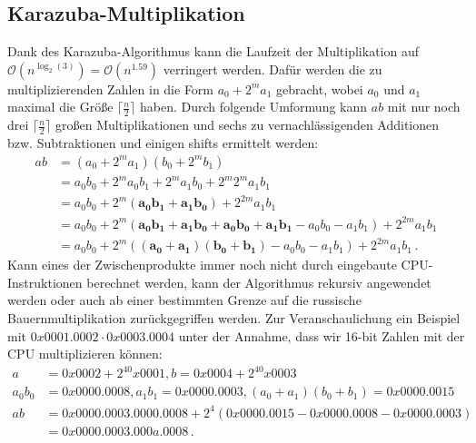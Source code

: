 \documentclass[course=erap]{aspdoc}
\begin{document}
\subsection{Karazuba-Multiplikation}
Dank des Karazuba-Algorithmus kann die Laufzeit der Multiplikation auf $\mathcal{O}(n^{\log_2(3)}) = \mathcal{O}(n^{1.59})$\cite{the_art_of_programming} verringert werden.
Dafür werden die zu multiplizierenden Zahlen in die Form $a_0+2^ma_1$ gebracht, wobei $a_0$ und $a_1$ maximal die Größe $\lceil\frac{n}{2}\rceil$ haben.
Durch folgende Umformung kann $ab$ mit nur noch drei $\lceil\frac{n}{2}\rceil$ großen Multiplikationen und sechs zu vernachlässigenden Additionen bzw. Subtraktionen und einigen shifts ermittelt werden:
\begin{align*}
a b &= (a_0+2^ma_1) (b_0+2^mb_1)\\
      &= a_0b_0 + 2^ma_0b_1 + 2^ma_1b_0 + 2^m2^ma_1b_1\\
      &= a_0b_0 + 2^m(\mathbf{a_0b_1 + a_1b_0}) + 2^{2m}a_1b_1\\
      &= a_0b_0 + 2^m(\mathbf{a_0b_1 + a_1b_0 + a_0b_0 + a_1b_1} - a_0b_0 - a_1b_1) + 2^{2m}a_1b_1\\
      &= a_0b_0 + 2^m(\mathbf{(a_0+a_1)(b_0+b_1)} - a_0b_0 - a_1b_1) + 2^{2m}a_1b_1 \, .
\end{align*}
Kann eines der Zwischenprodukte immer noch nicht durch eingebaute CPU-Instruktionen berechnet werden, kann der Algorithmus rekursiv angewendet werden oder auch ab einer bestimmten Grenze auf die russische Bauernmultiplikation zurückgegriffen werden.
Zur Veranschaulichung ein Beispiel mit $0x0001.0002 \cdot 0x0003.0004$ unter der Annahme, dass wir 16-bit Zahlen mit der CPU multiplizieren können:
\begin{align*}
      a &= 0x0002 + 2^40x0001, b = 0x0004 + 2^40x0003 \\
      a_0b_0 &= 0x0000.0008, a_1b_1 = 0x0000.0003, (a_0+a_1)(b_0+b_1) = 0x0000.0015 \\
      ab &= 0x0000.0003.0000.0008 + 2^4(0x0000.0015-0x0000.0008-0x0000.0003) \\
      &= 0x0000.0003.000a.0008 \, .
\end{align*}
\end{document}

